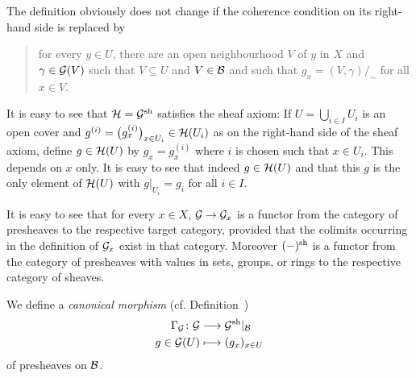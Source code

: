 \documentclass[a4paper,parskip=half,numbers=enddot, DIV=12]{scrreprt}
\begin{document}
\begin{rem*}    
    \begin{alphanumerate}
      \item 
        The definition  obviously does not change if the coherence condition on its right-hand side is replaced by 
        \begin{quote}
            for every $y\in U$, there are an open neighbourhood $V$ of $y$ in $X$ and $\gamma\in \mathcal{G}(V)$ such that $V\subseteq U$ and $V\in\mathcal{B}$ and such that $g_x =(V,\gamma)/_\sim$ for all $x\in V$.
        \end{quote}
      \item 
        It is easy to see that $\mathcal{H}=\mathcal{G}^{\mathrm{sh}}$ satisfies the sheaf axiom: If $U = \bigcup_{i\in I} U_i$ is an open cover and $g^{(i)} = \big(g^{(i)}_x\big)_{x\in U_i}\in \mathcal{H}(U_i)$ as on the right-hand side of the sheaf axiom, define $g\in \mathcal{H}(U)$ by $g_x = g_x^{(i)}$ where $i$ is chosen such that $x\in U_i$. This depends on $x$ only. It is easy to see that indeed $g\in \mathcal{H}(U)$ and that this $g$ is the only element of $\mathcal{H}(U)$ with $g|_{U_i} = g_i$ for all $i\in I$.
      \item
        It is easy to see that for every $x\in X$, $\mathcal{G}\to \mathcal{G}_x$ is a functor from the category of presheaves to the respective target category, provided that the colimits occurring in the definition of $\mathcal{G}_x$ exist in that category. Moreover $(-)^{\mathrm{sh}}$ is a functor from the category of presheaves with values in sets, groups, or rings to the respective category of sheaves.
    \end{alphanumerate}
\end{rem*}
We define a \emph{canonical morphism} (cf. Definition~)
\begin{align*}
    \Gamma_\Gg\colon\Gg&\morphism \Gg^\sh|_\Bb\\
    g\in \Gg(U) &\longmapsto (g_x)_{x\in U}
\end{align*}
of presheaves on $\mathcal{B}$.
\end{document}
